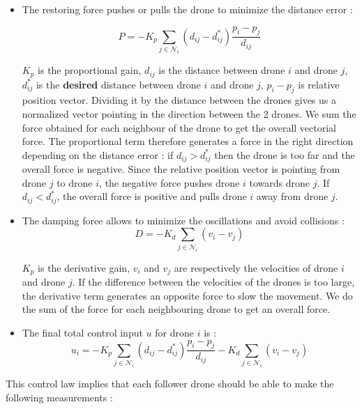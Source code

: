\documentclass[conference]{IEEEtran}
\begin{document}
\begin{itemize}
    \item The restoring force pushes or pulls the drone to minimize the distance error :

    \begin{equation}
       P=-K_p\sum_{j\in \mathcal{N}_i}(d_{ij}-d^\ast _{ij})\frac{p_i-p_j}{d_{ij}}
    \end{equation}
    

    $K_p$ is the proportional gain, $d_{ij}$ is the distance between drone $i$ and drone $j$, $d^\ast_{ij}$ is the \textbf{desired} distance between drone $i$ and drone $j$, $p_i-p_j$ is relative position vector. Dividing it by the distance between the drones gives us a normalized vector pointing in the direction between the 2 drones. We sum the force obtained for each neighbour of the drone to get the overall vectorial force. The proportional term therefore generates a force in the right direction depending on the distance error : if $d_{ij}>d^\ast _{ij}$ then the drone is too far and the overall force is negative. Since the relative position vector is pointing from drone  $j$ to drone $i$, the negative force pushes drone $i$ towards drone $j$. If $d_{ij}<d^\ast _{ij}$, the overall force is positive and pulls drone $i$ away from drone $j$.

    
    \item The damping force allows to minimize the oscillations and avoid collisions :
    \begin{equation}
        D=-K_d\sum_{j\in \mathcal{N}_i}(v_i-v_j)
    \end{equation}
    

    $K_p$ is the derivative gain, $v_{i}$ and $v_j$ are respectively the velocities of drone $i$ and drone $j$. If the difference between the velocities of the drones is too large, the derivative term generates an opposite force to slow the movement. We do the sum of the force for each neighbouring drone to get an overall force.

    \item The final total control input $u$ for drone $i$ is : 
    \begin{equation}
          u_i=-K_p\sum_{j\in \mathcal{N}_i}(d_{ij}-d^\ast _{ij})\frac{p_i-p_j}{d_{ij}}-K_d\sum_{j\in \mathcal{N}_i}(v_i-v_j)
    \end{equation}
  
\end{itemize}

This control law implies that each follower drone  should be able to make the following measurements :
\end{document}
